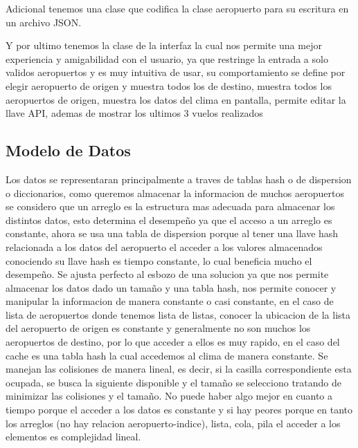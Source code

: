 \documentclass[12pt]{article}
\begin{document}
Adicional tenemos una clase que codifica la clase aeropuerto para su escritura en un archivo JSON.

Y por ultimo tenemos la clase de la interfaz la cual nos permite una mejor experiencia y amigabilidad con el usuario, ya que restringe la entrada a solo validos aeropuertos y es muy intuitiva de usar, su comportamiento se define por elegir aeropuerto de origen y muestra todos los de destino, muestra todos los aeropuertos de origen, muestra los datos del clima en pantalla, permite editar la llave API, ademas de mostrar los ultimos 3 vuelos realizados

\subsection{Modelo de Datos}
Los datos se representaran principalmente a traves de tablas hash o de dispersion o diccionarios, como queremos almacenar la informacion de muchos aeropuertos se considero que un arreglo es la estructura mas adecuada para almacenar los distintos datos, esto determina el desempeño ya que el acceso a un arreglo es constante, ahora se usa una tabla de dispersion porque al tener una llave hash relacionada a los datos del aeropuerto el acceder a los valores almacenados conociendo su llave hash es tiempo constante, lo cual beneficia mucho el desempeño. Se ajusta perfecto al esbozo de una solucion ya que nos permite almacenar los datos dado un tamaño y una tabla hash, nos permite conocer y manipular la informacion de manera constante o casi constante, en el caso de lista de aeropuertos donde tenemos lista de listas, conocer la ubicacion de la lista del aeropuerto de origen es constante y generalmente no son muchos los aeropuertos de destino, por lo que acceder a ellos es muy rapido, en el caso del cache es una tabla hash la cual accedemos al clima de manera constante. Se manejan las colisiones de manera lineal, es decir, si la casilla correspondiente esta ocupada, se busca la siguiente disponible y el tamaño se selecciono tratando de minimizar las colisiones y el tamaño. No puede haber algo mejor en cuanto a tiempo porque el acceder a los datos es constante y si hay peores porque en tanto los arreglos (no hay relacion aeropuerto-indice), lista, cola, pila el acceder a los elementos es complejidad lineal.
\end{document}
